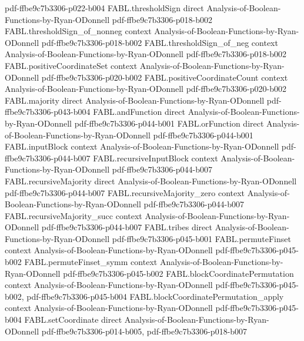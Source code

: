 \begin{theorem}
  {pdf-ffbe9c7b3306-p022-b004}
\proofstep
  {FABL.thresholdSign}
  {direct}
  {Analysis-of-Boolean-Functions-by-Ryan-ODonnell}
  {pdf-ffbe9c7b3306-p018-b002}
\proofstep
  {FABL.thresholdSign_of_nonneg}
  {context}
  {Analysis-of-Boolean-Functions-by-Ryan-ODonnell}
  {pdf-ffbe9c7b3306-p018-b002}
\proofstep
  {FABL.thresholdSign_of_neg}
  {context}
  {Analysis-of-Boolean-Functions-by-Ryan-ODonnell}
  {pdf-ffbe9c7b3306-p018-b002}
\proofstep
  {FABL.positiveCoordinateSet}
  {context}
  {Analysis-of-Boolean-Functions-by-Ryan-ODonnell}
  {pdf-ffbe9c7b3306-p020-b002}
\proofstep
  {FABL.positiveCoordinateCount}
  {context}
  {Analysis-of-Boolean-Functions-by-Ryan-ODonnell}
  {pdf-ffbe9c7b3306-p020-b002}
\proofstep
  {FABL.majority}
  {direct}
  {Analysis-of-Boolean-Functions-by-Ryan-ODonnell}
  {pdf-ffbe9c7b3306-p043-b004}
\proofstep
  {FABL.andFunction}
  {direct}
  {Analysis-of-Boolean-Functions-by-Ryan-ODonnell}
  {pdf-ffbe9c7b3306-p044-b001}
\proofstep
  {FABL.orFunction}
  {direct}
  {Analysis-of-Boolean-Functions-by-Ryan-ODonnell}
  {pdf-ffbe9c7b3306-p044-b001}
\proofstep
  {FABL.inputBlock}
  {context}
  {Analysis-of-Boolean-Functions-by-Ryan-ODonnell}
  {pdf-ffbe9c7b3306-p044-b007}
\proofstep
  {FABL.recursiveInputBlock}
  {context}
  {Analysis-of-Boolean-Functions-by-Ryan-ODonnell}
  {pdf-ffbe9c7b3306-p044-b007}
\proofstep
  {FABL.recursiveMajority}
  {direct}
  {Analysis-of-Boolean-Functions-by-Ryan-ODonnell}
  {pdf-ffbe9c7b3306-p044-b007}
\proofstep
  {FABL.recursiveMajority_zero}
  {context}
  {Analysis-of-Boolean-Functions-by-Ryan-ODonnell}
  {pdf-ffbe9c7b3306-p044-b007}
\proofstep
  {FABL.recursiveMajority_succ}
  {context}
  {Analysis-of-Boolean-Functions-by-Ryan-ODonnell}
  {pdf-ffbe9c7b3306-p044-b007}
\proofstep
  {FABL.tribes}
  {direct}
  {Analysis-of-Boolean-Functions-by-Ryan-ODonnell}
  {pdf-ffbe9c7b3306-p045-b001}
\proofstep
  {FABL.permuteFinset}
  {context}
  {Analysis-of-Boolean-Functions-by-Ryan-ODonnell}
  {pdf-ffbe9c7b3306-p045-b002}
\proofstep
  {FABL.permuteFinset_symm}
  {context}
  {Analysis-of-Boolean-Functions-by-Ryan-ODonnell}
  {pdf-ffbe9c7b3306-p045-b002}
\proofstep
  {FABL.blockCoordinatePermutation}
  {context}
  {Analysis-of-Boolean-Functions-by-Ryan-ODonnell}
  {pdf-ffbe9c7b3306-p045-b002,
    pdf-ffbe9c7b3306-p045-b004}
\proofstep
  {FABL.blockCoordinatePermutation_apply}
  {context}
  {Analysis-of-Boolean-Functions-by-Ryan-ODonnell}
  {pdf-ffbe9c7b3306-p045-b004}
\proofstep
  {FABL.setCoordinate}
  {direct}
  {Analysis-of-Boolean-Functions-by-Ryan-ODonnell}
  {pdf-ffbe9c7b3306-p014-b005,
    pdf-ffbe9c7b3306-p018-b007}

\end{theorem}
